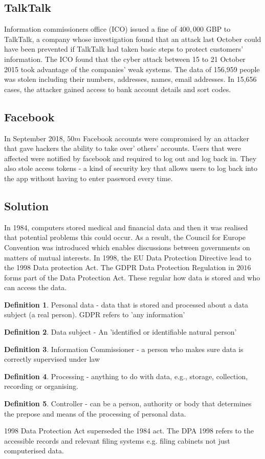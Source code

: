 \documentclass[a4paper]{article}
\theoremstyle{plain}
\theoremstyle{definition}
\newtheorem{defn}{Definition}[section]
\theoremstyle{remark}
\begin{document}
\subsection{TalkTalk}

Information commissioners office (ICO) issued a fine of $400,000$ GBP to TalkTalk, a company whose investigation found that an attack last October could have been prevented if TalkTalk had taken basic steps to protect customers' information. The ICO found that the cyber attack between 15 to 21 October 2015 took advantage of the companies' weak systems. The data of 156,959 people was stolen including their numbers, addresses, names, email addresses. In 15,656 cases, the attacker gained access to bank account details and sort codes. \\
\subsection{Facebook}
In September 2018, $50m$ Facebook accounts were compromised by an attacker that gave hackers the ability to take over' others' accounts. Users that were affected were notified by facebook and required to log out and log back in. They also stole access tokens - a kind of security key that allows users to log back into the app without having to enter password every time.
\subsection{Solution}
In 1984, computers stored medical and financial data and then it was realised that potential problems this could occur. As a result, the Council for Europe Convention was introduced which enables discussions between governments on matters of mutual interests. In 1998, the EU Data Protection Directive lead to the 1998 Data protection Act. The GDPR Data Protection Regulation in $2016$ forms part of the Data Protection Act. These regular how data is stored and who can access the data. 
\begin{defn}
	Personal data - data that is stored and processed about a data subject (a real person). GDPR refers to 'any information'
\end{defn}
\begin{defn}
	Data subject - An 'identified or identifiable natural person'
\end{defn}
\begin{defn}
	Information Commissioner - a person who makes sure data is correctly supervised under law
\end{defn}
\begin{defn}
	Processing - anything to do with data, e.g., storage, collection, recording or organising.
\end{defn}
\begin{defn}
	Controller - can be a person, authority or body that determines the prepose and means of the processing of personal data.
\end{defn}
1998 Data Protection Act superseded the 1984 act. The DPA 1998 refers to the accessible records and relevant filing systems e.g. filing cabinets not just computerised data. 
\end{document}
